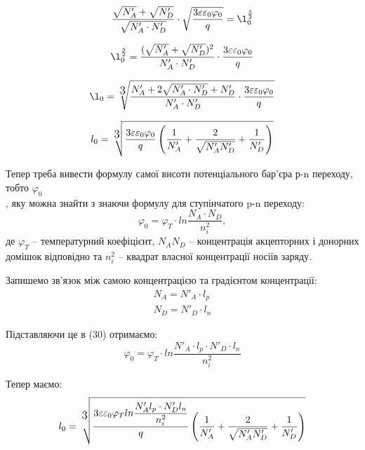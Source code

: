 \documentclass[14pt,a4paper]{scrartcl}
\begin{document}
\begin{equation}
\dfrac{\sqrt{N'_A}+\sqrt{N'_D}}{\sqrt{N'_A\cdot N'_D}}\cdot \sqrt{\dfrac{3\varepsilon\varepsilon_0\varphi_0}{q}}=\l_0^{\frac{3}{2}}
\end{equation}


\begin{equation}
\l_0^{\frac{3}{2}}= \dfrac{(\sqrt{N'_A}+\sqrt{N'_D})^2}{N'_A\cdot N'_D}\cdot \dfrac{3\varepsilon\varepsilon_0\varphi_0}{q}
\end{equation}


\begin{equation}
\l_0= \sqrt[\text{\large{3}}] {\dfrac{N'_A+ 2\sqrt{N'_A\cdot N'_D}+ N'_D}{N'_A\cdot N'_D} \cdot \dfrac{3\varepsilon\varepsilon_0\varphi_0}{q}}
\end{equation}


\begin{equation}
l_0 = \sqrt[\text{\large{3}}] {\dfrac{3\varepsilon\varepsilon_0\varphi_0}{q} \left(\dfrac{1}{N'_A}+ \dfrac{2}{\sqrt{N'_A N'_D}}+\dfrac{1}{N'_D}\right)}
\label{eq:ref}
\end{equation}

\vspace{2cm}

Тепер треба вивести формулу самої висоти потенціального бар’єра р-n переходу, тобто $\varphi_0$\\, яку можна знайти з знаючи формулу для ступінчатого p-n переходу:
\begin{equation}
\varphi_0=\varphi_T\cdot ln\dfrac{N_A\cdot N_D}{n_i^2},
\label{eq:ref}
\end{equation}
де $\varphi_T$ -- температурний коефіцієнт, $N_A N_D$ -- концентрація акцепторних і донорних домішок відповідно та $n_i^2$ -- квадрат власної концентрації носіїв заряду.



Запишемо зв'язок між самою концентрацією та градієнтом концентрації:
\begin{align}
N_A= N'_A\cdot l_p\\
N_D= N'_D\cdot l_n
\end{align}

Підставляючи це в (30) отримаємо:
\begin{equation}
\varphi_0=\varphi_T\cdot ln\dfrac{N'_A\cdot l_p\cdot  N'_D\cdot l_n}{n_i^2}
\label{eq:ref}
\end{equation}

Тепер маємо:
\begin{equation}
l_0 = \sqrt[\text{\large{3}}] {\dfrac{3 \varepsilon \varepsilon_0 \varphi_T ln\dfrac{N'_A l_p\cdot  N'_D l_n}{n_i^2}}{q} \left(\dfrac{1}{N'_A}+ \dfrac{2}{\sqrt{N'_A N'_D}}+\dfrac{1}{N'_D}\right)}
\label{eq:ref}
\end{equation}
\end{document}
